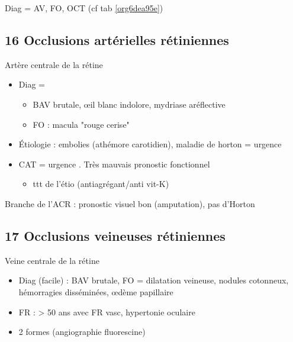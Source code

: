 \documentclass[11pt]{article}
\begin{document}
Diag = AV, FO, OCT (cf tab \ref{org6dea95e})
\begin{table}
\caption{Formes de DMLA}
\centering
{}
\label{org6dea95e}
\end{table}
\subsection{16 Occlusions artérielles rétiniennes}
\label{sec:org9b429b0}
Artère centrale de la rétine 
\begin{itemize}
\item Diag = 
\begin{itemize}
\item BAV brutale, \oe{}il blanc indolore, mydriase aréflective
\item FO : macula "rouge cerise"
\end{itemize}
\item Étiologie : embolies (athémore carotidien), maladie de horton = urgence
\item CAT = urgence . Très mauvais pronostic fonctionnel
\begin{itemize}
\item ttt de l'étio (antiagrégant/anti vit-K)
\end{itemize}
\end{itemize}
Branche de l'ACR : pronostic visuel bon (amputation), pas d'Horton
\subsection{17 Occlusions veineuses rétiniennes}
\label{sec:org7474813}
Veine centrale de la rétine
\begin{itemize}
\item Diag (facile) : BAV brutale, FO = dilatation veineuse, nodules cotonneux,
hémorragies disséminées, \oe{}dème papillaire
\item FR : > 50 ans avec FR vasc, hypertonie oculaire
\item 2 formes (angiographie fluorescine)
\end{itemize}
\end{document}
